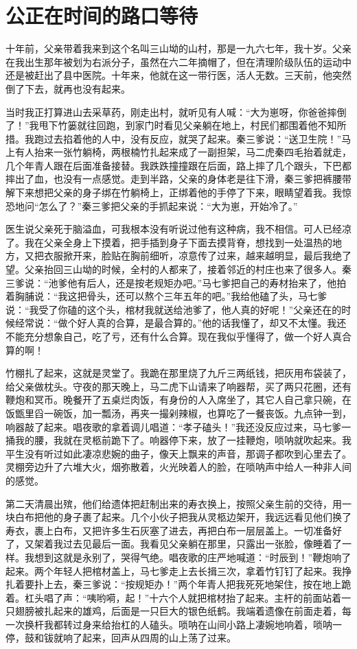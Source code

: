 \documentclass[12pt,oneside]{book}
\begin{document}
\chapter{公正在时间的路口等待}
十年前，父亲带着我来到这个名叫三山坳的山村，那是一九六七年，我十岁。父亲在我出生那年被划为右派分子，虽然在六二年摘帽了，但在清理阶级队伍的运动中还是被赶出了县中医院。十年来，他就在这一带行医，活人无数。三天前，他突然倒了下去，就再也没有起来。

当时我正打算进山去采草药，刚走出村，就听见有人喊：``大为崽呀，你爸爸摔倒了！''我甩下竹篓就往回跑，到家门时看见父亲躺在地上，村民们都围着他不知所措。我跑过去掐着他的人中，没有反应，就哭了起来。秦三爹说：``送卫生院！''马上有人抬来一张竹躺椅，两根楠竹扎起来成了一副担架，马二虎秦四毛抬着就走，几个年青人跟在后面准备接替。我跌跌撞撞跟在后面，路上摔了几个跟头，下巴都摔出了血，也没有一点感觉。走到半路，父亲的身体老是往下滑，秦三爹把裤腰带解下来想把父亲的身子绑在竹躺椅上，正绑着他的手停了下来，眼睛望着我。我惊恐地问``怎么了？''秦三爹把父亲的手抓起来说：``大为崽，开始冷了。''

医生说父亲死于脑溢血，可我根本没有听说过他有这种病，我不相信。可人已经凉了。我在父亲全身上下摸着，把手插到身子下面去摸背脊，想找到一处温热的地方，又把衣服掀开来，脸贴在胸前细听，凉意传了过来，越来越明显，最后我绝了望。父亲抬回三山坳的时候，全村的人都来了，接着邻近的村庄也来了很多人。秦三爹说：``池爹他有后人，还是按老规矩办吧。''马七爹把自己的寿材抬来了，他拍着胸脯说：``我这把骨头，还可以熬个三年五年的吧。''我给他磕了头，马七爹说：``我受了你磕的这个头，棺材我就送给池爹了，他人真的好呢！''父亲还在的时候经常说：``做个好人真的合算，是最合算的。''他的话我懂了，却又不太懂。我还不能充分想象自己，吃了亏，还有什么合算。现在我似乎懂得了，做一个好人真合算的啊！

竹棚扎了起来，这就是灵堂了。我跪在那里烧了九斤三两纸钱，把灰用布袋装了，给父亲做枕头。守夜的那天晚上，马二虎下山请来了响器帮，买了两只花圈，还有鞭炮和冥币。晚餐开了五桌烂肉饭，有身份的人入席坐了，其它人自己拿只碗，在饭甑里舀一碗饭，加一瓢汤，再夹一撮剁辣椒，也算吃了一餐丧饭。九点钟一到，响器敲了起来。唱夜歌的拿着调儿唱道：``孝子磕头！''我还没反应过来，马七爹一捅我的腰，我就在灵柩前跪下了。响器停下来，放了一挂鞭炮，唢呐就吹起来。我平生没有听过如此凄凉悲婉的曲子，像天上飘来的声音，那调子都吹到心里去了。灵棚旁边升了六堆大火，烟弥散着，火光映着人的脸，在唢呐声中给人一种非人间的感觉。

第二天清晨出殡，他们给遗体把赶制出来的寿衣换上，按照父亲生前的交待，用一块白布把他的身子裹了起来。几个小伙子把我从灵柩边架开，我远远看见他们换了寿衣，裹上白布，又把许多生石灰塞了进去，再把白布一层层盖上。一切准备好了，又架着我过去见最后一面。我看见父亲躺在那里，只露出一张脸，像睡着了一样。我想到这就是永别了，哭得气绝。唱夜歌的庄严地喊道：``时辰到！''鞭炮响了起来。两个年轻人把棺材盖上，马七爹走上去长揖三次，拿着竹钉钉了起来。我挣扎着要扑上去，秦三爹说：``按规矩办！''两个年青人把我死死地架住，按在地上跪着。杠头唱了声：``咦哟嗬，起！''十六个人就把棺材抬了起来。主杆的前面站着一只翅膀被扎起来的雄鸡，后面是一只巨大的银色纸鹤。我端着遗像在前面走着，每一次换杆我都转过身来给抬杠的人磕头。唢呐在山间小路上凄婉地响着，唢呐一停，鼓和钹就响了起来，回声从四周的山上荡了过来。
\end{document}
